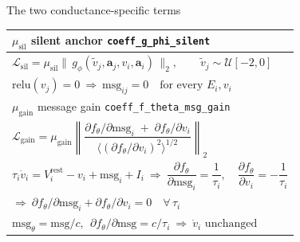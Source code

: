 \documentclass[aspectratio=169]{beamer}
\begin{document}
\begin{frame}{The two conductance-specific terms}
\vspace*{0.45cm}
\centering\small
\begin{tabular}{@{}l@{}}
\toprule
$\mu_{\mathrm{sil}}$ \quad silent anchor \quad \texttt{coeff\_g\_phi\_silent} \\
\midrule
$\mathcal{L}_{\mathrm{sil}} = \mu_{\mathrm{sil}}
 \bigl\lVert\, g_\phi(\tilde v_j, \mathbf{a}_j, v_i, \mathbf{a}_i) \,\bigr\rVert_2 ,
 \qquad \tilde v_j \sim \mathcal{U}[-2, 0]$ \\[6pt]
$\mathrm{relu}(v_j) = 0 \ \Rightarrow\ \mathrm{msg}_{ij} = 0
 \quad\text{for every } E_i, v_i$ \\
\midrule
$\mu_{\mathrm{gain}}$ \quad message gain \quad \texttt{coeff\_f\_theta\_msg\_gain} \\
\midrule
$\mathcal{L}_{\mathrm{gain}} = \mu_{\mathrm{gain}}
 \left\lVert \dfrac{\partial f_\theta/\partial \mathrm{msg}_i
   \;+\; \partial f_\theta/\partial v_i}
  {\bigl\langle (\partial f_\theta/\partial v_i)^2 \bigr\rangle^{1/2}}
 \right\rVert_2$ \\[8pt]
$\tau_i \dot v_i = V^{\mathrm{rest}}_i - v_i + \mathrm{msg}_i + I_i
 \ \Rightarrow\
 \dfrac{\partial f_\theta}{\partial \mathrm{msg}_i} = \dfrac{1}{\tau_i},\quad
 \dfrac{\partial f_\theta}{\partial v_i} = -\dfrac{1}{\tau_i}$ \\[4pt]
$\Rightarrow\ \partial f_\theta/\partial \mathrm{msg}_i
 + \partial f_\theta/\partial v_i = 0 \quad \forall\, \tau_i$ \\[6pt]
$\mathrm{msg}_\theta = \mathrm{msg}/c,\ \
 \partial f_\theta/\partial \mathrm{msg} = c/\tau_i
 \ \Rightarrow\ \dot v_i \text{ unchanged}$ \\
\bottomrule
\end{tabular}
\end{frame}
\end{document}
